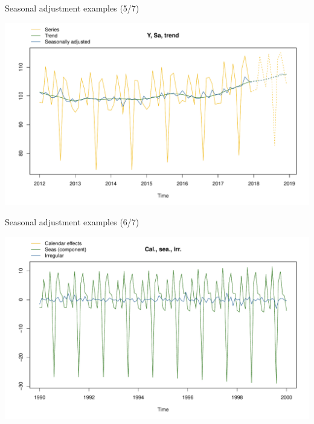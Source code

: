 \documentclass[10pt,xcolor=table,color={dvipsnames,usenames},ignorenonframetext,usepdftitle=false,french]{beamer}
\newenvironment{Shaded}{\begin{snugshade}}{\end{snugshade}}
\newcommand{\DataTypeTok}[1]{\textcolor[rgb]{0.13,0.29,0.53}{#1}}
\newcommand{\DecValTok}[1]{\textcolor[rgb]{0.00,0.00,0.81}{#1}}
\newcommand{\KeywordTok}[1]{\textcolor[rgb]{0.13,0.29,0.53}{\textbf{#1}}}
\newcommand{\NormalTok}[1]{#1}
\newcommand{\OperatorTok}[1]{\textcolor[rgb]{0.81,0.36,0.00}{\textbf{#1}}}
\newcommand{\StringTok}[1]{\textcolor[rgb]{0.31,0.60,0.02}{#1}}
\begin{document}
\begin{frame}[fragile]{Seasonal adjustment examples (5/7)}
\protect\hypertarget{seasonal-adjustment-examples-57}{}

\begin{Shaded}
\end{Shaded}

\includegraphics{img/markdown-unnamed-chunk-10-1.pdf}

\end{frame}

\begin{frame}[fragile]{Seasonal adjustment examples (6/7)}
\protect\hypertarget{seasonal-adjustment-examples-67}{}

\begin{Shaded}
\end{Shaded}

\includegraphics{img/markdown-unnamed-chunk-11-1.pdf}

\end{frame}
\end{document}
